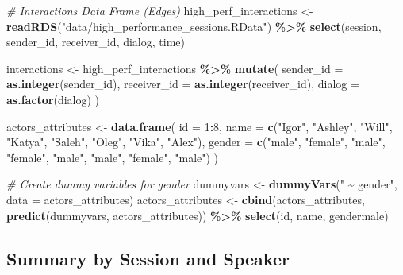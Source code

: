 \documentclass[
]{article}
\newenvironment{Shaded}{\begin{snugshade}}{\end{snugshade}}
\newcommand{\AttributeTok}[1]{\textcolor[rgb]{0.13,0.29,0.53}{#1}}
\newcommand{\CommentTok}[1]{\textcolor[rgb]{0.56,0.35,0.01}{\textit{#1}}}
\newcommand{\DecValTok}[1]{\textcolor[rgb]{0.00,0.00,0.81}{#1}}
\newcommand{\FunctionTok}[1]{\textcolor[rgb]{0.13,0.29,0.53}{\textbf{#1}}}
\newcommand{\NormalTok}[1]{#1}
\newcommand{\OtherTok}[1]{\textcolor[rgb]{0.56,0.35,0.01}{#1}}
\newcommand{\SpecialCharTok}[1]{\textcolor[rgb]{0.81,0.36,0.00}{\textbf{#1}}}
\newcommand{\StringTok}[1]{\textcolor[rgb]{0.31,0.60,0.02}{#1}}
\begin{document}
\begin{Shaded}
\begin{Highlighting}[]
\CommentTok{\# Interactions Data Frame (Edges)}
\NormalTok{high\_perf\_interactions }\OtherTok{\textless{}{-}} \FunctionTok{readRDS}\NormalTok{(}\StringTok{"data/high\_performance\_sessions.RData"}\NormalTok{) }\SpecialCharTok{\%\textgreater{}\%} 
  \FunctionTok{select}\NormalTok{(session, sender\_id, receiver\_id, dialog, time)}


\NormalTok{interactions }\OtherTok{\textless{}{-}}\NormalTok{ high\_perf\_interactions }\SpecialCharTok{\%\textgreater{}\%}
  \FunctionTok{mutate}\NormalTok{(}
    \AttributeTok{sender\_id =} \FunctionTok{as.integer}\NormalTok{(sender\_id),  }
    \AttributeTok{receiver\_id =} \FunctionTok{as.integer}\NormalTok{(receiver\_id), }
    \AttributeTok{dialog =} \FunctionTok{as.factor}\NormalTok{(dialog) }
\NormalTok{  )}



\NormalTok{actors\_attributes }\OtherTok{\textless{}{-}} \FunctionTok{data.frame}\NormalTok{(}
  \AttributeTok{id =} \DecValTok{1}\SpecialCharTok{:}\DecValTok{8}\NormalTok{,}
  \AttributeTok{name =} \FunctionTok{c}\NormalTok{(}\StringTok{"Igor"}\NormalTok{, }\StringTok{"Ashley"}\NormalTok{, }\StringTok{"Will"}\NormalTok{, }\StringTok{"Katya"}\NormalTok{, }\StringTok{"Saleh"}\NormalTok{, }\StringTok{"Oleg"}\NormalTok{, }\StringTok{"Vika"}\NormalTok{, }\StringTok{"Alex"}\NormalTok{),}
  \AttributeTok{gender =} \FunctionTok{c}\NormalTok{(}\StringTok{"male"}\NormalTok{, }\StringTok{"female"}\NormalTok{, }\StringTok{"male"}\NormalTok{, }\StringTok{"female"}\NormalTok{, }\StringTok{"male"}\NormalTok{, }\StringTok{"male"}\NormalTok{, }\StringTok{"female"}\NormalTok{, }\StringTok{"male"}\NormalTok{)}
\NormalTok{)}

\CommentTok{\# Create dummy variables for gender}
\NormalTok{dummyvars }\OtherTok{\textless{}{-}} \FunctionTok{dummyVars}\NormalTok{(}\StringTok{" \textasciitilde{} gender"}\NormalTok{, }\AttributeTok{data =}\NormalTok{ actors\_attributes)}
\NormalTok{actors\_attributes }\OtherTok{\textless{}{-}} \FunctionTok{cbind}\NormalTok{(actors\_attributes, }\FunctionTok{predict}\NormalTok{(dummyvars, actors\_attributes)) }\SpecialCharTok{\%\textgreater{}\%}
  \FunctionTok{select}\NormalTok{(id, name, gendermale)}
\end{Highlighting}
\end{Shaded}

\hypertarget{summary-by-session-and-speaker}{%
\subsection{Summary by Session and
Speaker}\label{summary-by-session-and-speaker}}
\end{document}
